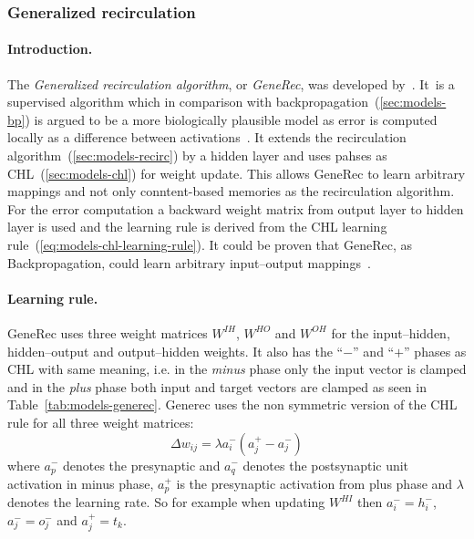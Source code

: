 \subsubsection{Generalized recirculation}
\label{sec:models-generec} 

\paragraph{Introduction.} 
The \emph{Generalized recirculation algorithm}, or \emph{GeneRec}, was developed by~\citet{o1996bio}. It~is a supervised algorithm which in comparison with backpropagation~(\ref{sec:models-bp}) is argued to be a more biologically plausible model as error is computed locally as a difference between activations~\citep{o1998six, o2001generalization, da2011advances, schneider2009application}. It extends the recirculation algorithm~(\ref{sec:models-recirc}) by a hidden layer and uses pahses as CHL~(\ref{sec:models-chl}) for weight update. This allows GeneRec to learn arbitrary mappings and not only conntent-based memories as the recirculation algorithm. For the error computation a backward weight matrix from output layer to hidden layer is used and the learning rule is derived from the CHL learning rule~(\ref{eq:models-chl-learning-rule}). It could be proven that GeneRec, as Backpropagation, could learn arbitrary input--output mappings~\citep{o1996bio}. 

\paragraph{Learning rule.} 
\label{sec:models-generec-learning-rule} 
GeneRec uses three weight matrices $W^{IH}$, $W^{HO}$ and $W^{OH}$ for the input--hidden, hidden--output and output--hidden weights. It also has the ``$-$'' and ``$+$'' phases as CHL with same meaning, i.e. in the \emph{minus} phase only the input vector is clamped and in the \emph{plus} phase both input and target vectors are clamped as seen in Table~\ref{tab:models-generec}. Generec uses the non symmetric version of the CHL rule for all three weight matrices: 
\begin{equation}
  \label{eq:models-generec-learning-rule}
  \Delta w_{ij} = \lambda a^{-}_i(a^{+}_j - a^{-}_j)
\end{equation}
where $a^{-}_p$ denotes the presynaptic and $a^{-}_q$ denotes the postsynaptic unit activation in minus phase, $a^{+}_p$ is the presynaptic activation from plus phase and $\lambda$ denotes the learning rate. So for example when updating $W^{HI}$ then $a^{-}_i = h^{-}_i$, $a^{-}_j = o^{-}_j$ and $a^{+}_j = t_k$. 

